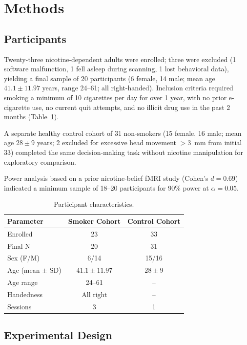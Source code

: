\documentclass[12pt]{article}
\begin{document}
\section{Methods}

\subsection{Participants}

Twenty-three nicotine-dependent adults were enrolled; three were excluded (1 software malfunction, 1 fell asleep during scanning, 1 lost behavioral data), yielding a final sample of 20 participants (6 female, 14 male; mean age $41.1 \pm 11.97$ years, range 24--61; all right-handed). Inclusion criteria required smoking a minimum of 10 cigarettes per day for over 1 year, with no prior e-cigarette use, no current quit attempts, and no illicit drug use in the past 2 months (Table~\ref{tab:participants}).

A separate healthy control cohort of 31 non-smokers (15 female, 16 male; mean age $28 \pm 9$ years; 2 excluded for excessive head movement $> 3$~mm from initial 33) completed the same decision-making task without nicotine manipulation for exploratory comparison.

Power analysis based on a prior nicotine-belief fMRI study (Cohen's $d = 0.69$) indicated a minimum sample of 18--20 participants for 90\% power at $\alpha = 0.05$.

\begin{table}[ht]
\centering
\caption{Participant characteristics.}
\label{tab:participants}
\begin{tabular}{lcc}
\toprule
Parameter & Smoker Cohort & Control Cohort \\
\midrule
Enrolled & 23 & 33 \\
Final N & 20 & 31 \\
Sex (F/M) & 6/14 & 15/16 \\
Age (mean $\pm$ SD) & $41.1 \pm 11.97$ & $28 \pm 9$ \\
Age range & 24--61 & -- \\
Handedness & All right & -- \\
Sessions & 3 & 1 \\
\bottomrule
\end{tabular}
\end{table}

\subsection{Experimental Design}
\end{document}
